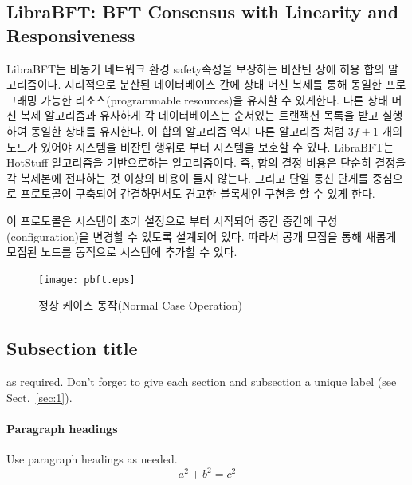 \subsection{LibraBFT: BFT Consensus with Linearity and Responsiveness}
LibraBFT는 비동기 네트워크 환경 safety속성을 보장하는 비잔틴 장애 허용 합의 알고리즘이다.
지리적으로 분산된 데이터베이스 간에 상태 머신 복제를 통해 동일한 프로그래밍 가능한 리소스(programmable resources)을
유지할 수 있게한다. 다른 상태 머신 복제 알고리즘과 유사하게 
각 데이터베이스는 순서있는 트랜잭션 목록을 받고 실행하여 동일한 상태를 유지한다.
 이 합의 알고리즘 역시 다른 알고리즘 처럼 \(3f+1\) 개의 노드가 있어야 시스템을 비잔틴 행위로 부터
시스템을 보호할 수 있다. LibraBFT는 HotStuff 알고리즘을 기반으로하는 알고리즘이다. 즉, 합의 결정 비용은
단순히 결정을 각 복제본에 전파하는 것 이상의 비용이 들지 않는다. 
그리고 단일 통신 단게를 중심으로 프로토콜이 구축되어 간결하면서도 견고한 블록체인 구현을 할 수 있게 한다.

이 프로토콜은 시스템이 초기 설정으로 부터 시작되어 중간 중간에 구성(configuration)을 변경할 수 있도록 설계되어 있다.
따라서 공개 모집을 통해 새롭게 모집된 노드를 동적으로 시스템에 추가할 수 있다. 





\begin{figure}
    \texttt{[image: pbft.eps]}
\caption{정상 케이스 동작(Normal Case Operation)}
\label{fig:1}       %
\end{figure}


\subsection{Subsection title}
\label{sec:11}
as required. Don't forget to give each section
and subsection a unique label (see Sect.~\ref{sec:1}).
\paragraph{Paragraph headings} Use paragraph headings as needed.
\begin{equation}
a^2+b^2=c^2
\end{equation}


